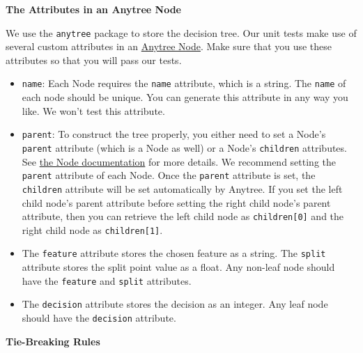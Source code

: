 \documentclass[12pt]{article}
\begin{document}
{\bf The Attributes in an Anytree Node}

We use the \verb+anytree+ package to store the decision tree. Our unit tests make use of several custom attributes in an \href{https://anytree.readthedocs.io/en/latest/api/anytree.node.html#anytree.node.node.Node}{Anytree Node}. Make sure that you use these attributes so that you will pass our tests.

\begin{itemize}

\item \verb+name+: Each Node requires the \verb+name+ attribute, which is a string. The \verb+name+ of each node should be unique. You can generate this attribute in any way you like. We won't test this attribute.

\item \verb+parent+: To construct the tree properly, you either need to set a Node's \verb+parent+ attribute (which is a Node as well) or a Node's \verb+children+ attributes. See \href{https://anytree.readthedocs.io/en/latest/api/anytree.node.html}{the Node documentation} for more details. We recommend setting the \verb+parent+ attribute of each Node. Once the \verb+parent+ attribute is set, the \verb+children+ attribute will be set automatically by Anytree. If you set the left child node's parent attribute before setting the right child node's parent attribute, then you can retrieve the left child node as \verb+children[0]+ and the right child node as \verb+children[1]+.

\item The \verb+feature+ attribute stores the chosen feature as a string. The \verb+split+ attribute stores the split point value as a float. Any non-leaf node should have the \verb+feature+ and \verb+split+ attributes.

\item The \verb+decision+ attribute stores the decision as an integer. Any leaf node should have the \verb+decision+ attribute.

\end{itemize}

{\bf Tie-Breaking Rules}
\end{document}
